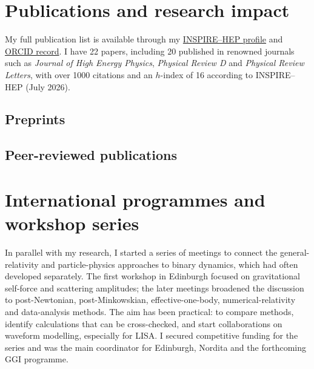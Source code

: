 \documentclass[11pt,a4paper,sans]{moderncv}
\begin{document}
\clearpage
\section{Publications and research impact}
My full publication list is available through my \href{https://inspirehep.net/authors/1812058?ui-citation-summary=true}{INSPIRE--HEP profile} and \href{https://orcid.org/0000-0001-7285-6295}{ORCID record}. I have 22 papers, including 20 published in renowned journals such as \emph{Journal of High Energy Physics}, \emph{Physical Review D} and \emph{Physical Review Letters}, with over 1000 citations and an $h$-index of 16 according to INSPIRE--HEP (July 2026).

\begin{refsection}
\nocite{Gonzo:2026yha,Alessio:2026bdi}
\subsection{Preprints}
{\footnotesize\printbibliography[heading=none]}
\end{refsection}

\begin{refsection}
\nocite{Barack:2026izc,Alessio:2025isu,Akpinar:2025tct,Alessio:2025flu,Akpinar:2025huz,Gonzo:2024xjk,Gonzo:2024zxo,Adamo:2024oxy,DeAngelis:2023lvf,Cristofoli:2021jas,Gonzo:2023cnv,Gonzo:2023goe,Adamo:2022ooq,Gonzo:2022tjm,Britto:2021pud,Cristofoli:2021vyo,Gonzo:2021drq,Gonzo:2020xza,Gonzo:2019fai,Banerjee:2020kaa}
\subsection{Peer-reviewed publications}
{\footnotesize\printbibliography[heading=none]}
\end{refsection}

\section{International programmes and workshop series}
In parallel with my research, I started a series of meetings to connect the general-relativity and particle-physics approaches to binary dynamics, which had often developed separately. The first workshop in Edinburgh focused on gravitational self-force and scattering amplitudes; the later meetings broadened the discussion to post-Newtonian, post-Minkowskian, effective-one-body, numerical-relativity and data-analysis methods. The aim has been practical: to compare methods, identify calculations that can be cross-checked, and start collaborations on waveform modelling, especially for LISA. I secured competitive funding for the series and was the main coordinator for Edinburgh, Nordita and the forthcoming GGI programme.
\end{document}

